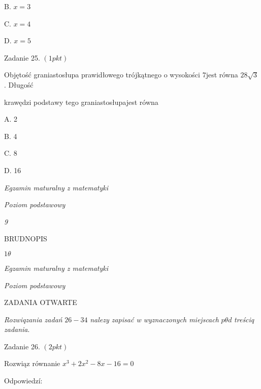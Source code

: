 \documentclass[a4paper,12pt]{article}
\begin{document}
B. $x=3$

C. $x=4$

D. $x=5$

Zadanie 25. $(1pkt)$

Objętość graniastosłupa prawidłowego trójkątnego o wysokości $7$jest równa $28\sqrt{3}$. Długość

krawędzi podstawy tego graniastosłupajest równa

A. 2

B. 4

C. 8

D. 16





{\it Egzamin maturalny z matematyki}

{\it Poziom podstawowy}

{\it 9}

BRUDNOPIS





$ 1\theta$

{\it Egzamin maturalny z matematyki}

{\it Poziom podstawowy}

ZADANIA OTWARTE

{\it Rozwiqzania zadań} $26-34$ {\it nalezy zapisać w wyznaczonych miejscach} $p\theta d$ {\it treściq zadania}.

Zadanie 26. $(2pkt)$

Rozwiąz równanie $x^{3}+2x^{2}-8x-16=0$

Odpowiedzí:
\end{document}
